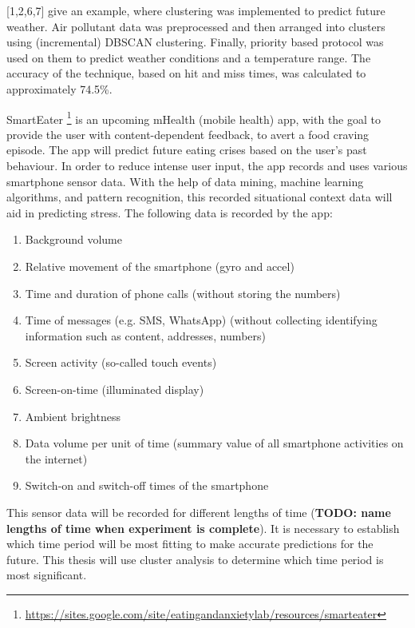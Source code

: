 \textcite{convexhullDbscan}[1,2,6,7] give an example, where clustering was implemented to predict future weather. Air pollutant data was preprocessed and then arranged into clusters using (incremental) DBSCAN clustering. Finally, priority based protocol was used on them to predict weather conditions and a temperature range. The accuracy of the technique, based on hit and miss times, was calculated to approximately 74.5\%.


SmartEater \footnote{\url{https://sites.google.com/site/eatingandanxietylab/resources/smarteater}} is an upcoming mHealth (mobile health) app, with the goal to provide the user with content-dependent feedback, to avert a food craving episode. The app will predict future eating crises based on the user's past behaviour. In order to reduce intense user input, the app records and uses various smartphone sensor data.  With the help of data mining, machine learning algorithms, and pattern recognition, this recorded situational context data will aid in predicting stress. The following data is recorded by the app:

\begin{enumerate}
	\item Background volume
	\item Relative movement of the smartphone (gyro and accel)
	\item Time and duration of phone calls (without storing the numbers)
	\item Time of messages (e.g. SMS, WhatsApp) (without collecting identifying information such as content, addresses, numbers)
	\item Screen activity (so-called touch events)
	\item Screen-on-time (illuminated display)
	\item Ambient brightness
	\item Data volume per unit of time (summary value of all smartphone activities on the internet)
	\item Switch-on and switch-off times of the smartphone
\end{enumerate}


This sensor data will be recorded for different lengths of time (\textbf{TODO: name lengths of time when experiment is complete}). It is necessary to establish which time period will be most fitting to make accurate predictions for the future. This thesis will use cluster analysis to determine which time period is most significant.

